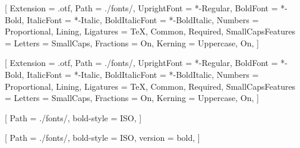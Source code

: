 
\setmainfont{LibertinusSerif}[%
Extension         = .otf,
Path              = ./fonts/,
UprightFont       = *-Regular,
BoldFont          = *-Bold,
ItalicFont        = *-Italic,
BoldItalicFont    = *-BoldItalic,
Numbers           = {Proportional, Lining},
Ligatures         = {TeX, Common, Required},
SmallCapsFeatures = {Letters = SmallCaps},
Fractions         = On,
Kerning           = {Uppercase, On},
]%

\setsansfont{LibertinusSans}[%
Extension         = .otf,
Path              = ./fonts/,
UprightFont       = *-Regular,
BoldFont          = *-Bold,
ItalicFont        = *-Italic,
BoldItalicFont    = *-BoldItalic,
Numbers           = {Proportional, Lining},
Ligatures         = {TeX, Common, Required},
SmallCapsFeatures = {Letters = SmallCaps},
Fractions         = On,
Kerning           = {Uppercase, On},
]%


\setmonofont{Latin Modern Mono}



[%
Path       = ./fonts/,
bold-style = ISO, %
]%

[%
Path       = ./fonts/,
bold-style = ISO, %
version    = bold,
]%


